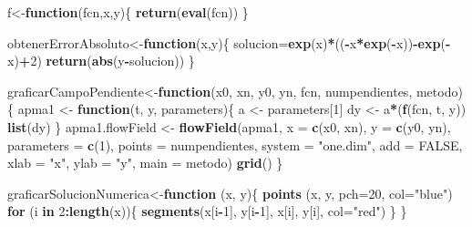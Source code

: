 \documentclass[]{article}
\newenvironment{Shaded}{\begin{snugshade}}{\end{snugshade}}
\newcommand{\KeywordTok}[1]{\textcolor[rgb]{0.13,0.29,0.53}{\textbf{#1}}}
\newcommand{\DataTypeTok}[1]{\textcolor[rgb]{0.13,0.29,0.53}{#1}}
\newcommand{\DecValTok}[1]{\textcolor[rgb]{0.00,0.00,0.81}{#1}}
\newcommand{\StringTok}[1]{\textcolor[rgb]{0.31,0.60,0.02}{#1}}
\newcommand{\OtherTok}[1]{\textcolor[rgb]{0.56,0.35,0.01}{#1}}
\newcommand{\ControlFlowTok}[1]{\textcolor[rgb]{0.13,0.29,0.53}{\textbf{#1}}}
\newcommand{\OperatorTok}[1]{\textcolor[rgb]{0.81,0.36,0.00}{\textbf{#1}}}
\newcommand{\NormalTok}[1]{#1}
\begin{document}
\begin{Shaded}
\begin{Highlighting}[]
\NormalTok{f<-}\ControlFlowTok{function}\NormalTok{(fcn,x,y)\{}
  \KeywordTok{return}\NormalTok{(}\KeywordTok{eval}\NormalTok{(fcn))}
\NormalTok{\}}

\NormalTok{obtenerErrorAbsoluto<-}\ControlFlowTok{function}\NormalTok{(x,y)\{}
\NormalTok{  solucion=}\KeywordTok{exp}\NormalTok{(x)}\OperatorTok{*}\NormalTok{((}\OperatorTok{-}\NormalTok{x}\OperatorTok{*}\KeywordTok{exp}\NormalTok{(}\OperatorTok{-}\NormalTok{x))}\OperatorTok{-}\KeywordTok{exp}\NormalTok{(}\OperatorTok{-}\NormalTok{x)}\OperatorTok{+}\DecValTok{2}\NormalTok{)}
  \KeywordTok{return}\NormalTok{(}\KeywordTok{abs}\NormalTok{(y}\OperatorTok{-}\NormalTok{solucion))}
\NormalTok{\}}

\NormalTok{graficarCampoPendiente<-}\ControlFlowTok{function}\NormalTok{(x0, xn, y0, yn, fcn, numpendientes, metodo)\{}
\NormalTok{  apma1 <-}\StringTok{ }\ControlFlowTok{function}\NormalTok{(t, y, parameters)\{}
\NormalTok{    a <-}\StringTok{ }\NormalTok{parameters[}\DecValTok{1}\NormalTok{] }
\NormalTok{    dy <-}\StringTok{ }\NormalTok{a}\OperatorTok{*}\NormalTok{(}\KeywordTok{f}\NormalTok{(fcn, t, y))}
    \KeywordTok{list}\NormalTok{(dy)}
\NormalTok{  \} }
\NormalTok{  apma1.flowField <-}\StringTok{ }\KeywordTok{flowField}\NormalTok{(apma1, }\DataTypeTok{x =} \KeywordTok{c}\NormalTok{(x0, xn), }
                               \DataTypeTok{y   =} \KeywordTok{c}\NormalTok{(y0, yn), }\DataTypeTok{parameters =} \KeywordTok{c}\NormalTok{(}\DecValTok{1}\NormalTok{), }
                               \DataTypeTok{points =}\NormalTok{ numpendientes, }\DataTypeTok{system =} \StringTok{"one.dim"}\NormalTok{, }
                               \DataTypeTok{add =} \OtherTok{FALSE}\NormalTok{, }\DataTypeTok{xlab =} \StringTok{"x"}\NormalTok{, }\DataTypeTok{ylab =} \StringTok{"y"}\NormalTok{, }
                               \DataTypeTok{main =}\NormalTok{ metodo)}
  \KeywordTok{grid}\NormalTok{()}
\NormalTok{\}}

\NormalTok{graficarSolucionNumerica<-}\ControlFlowTok{function}\NormalTok{ (x, y)\{}
  \KeywordTok{points}\NormalTok{ (x, y, }\DataTypeTok{pch=}\DecValTok{20}\NormalTok{, }\DataTypeTok{col=}\StringTok{"blue"}\NormalTok{)}
  \ControlFlowTok{for}\NormalTok{ (i }\ControlFlowTok{in} \DecValTok{2}\OperatorTok{:}\KeywordTok{length}\NormalTok{(x))\{}
    \KeywordTok{segments}\NormalTok{(x[i}\OperatorTok{-}\DecValTok{1}\NormalTok{], y[i}\OperatorTok{-}\DecValTok{1}\NormalTok{], x[i], y[i], }\DataTypeTok{col=}\StringTok{"red"}\NormalTok{)}
\NormalTok{  \}}
\NormalTok{\}}


\end{Highlighting}
\end{Shaded}
\end{document}
